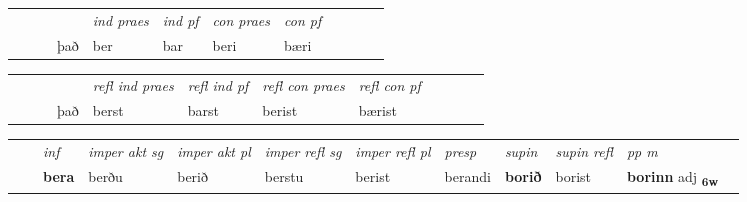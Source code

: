 \begin{tabular}{llllllllllll}
 & &  & &  \textit{ind praes} & \textit{ind pf} & \textit{con praes} & \textit{con pf} \\*
&  & & það & ber & bar & beri & bæri \\*
\cmidrule{5-9}
\end{tabular}


\begin{tabular}{llllllllllll}
 & &  & &  \textit{refl ind praes} & \textit{refl ind pf} & \textit{refl con praes} & \textit{refl con pf} \\*
 & &  & það & berst & barst & berist & bærist \\*
\cmidrule{5-9}
\end{tabular}


\begin{tabular}{llllllllllll}
 & & \textit{inf} & \textit{imper akt sg} & \textit{imper akt pl} & \textit{imper refl sg} & \textit{imper refl pl} & \textit{presp} & \textit{supin} & \textit{supin refl} & \textit{pp m}     \\*
  & & \textbf{bera} & berðu  & berið & berstu & berist & berandi &  \textbf{borið} & borist & \textbf{borinn} adj \textbf{\textsubscript{6w}} \\*
\cmidrule{1-12}
\end{tabular}



